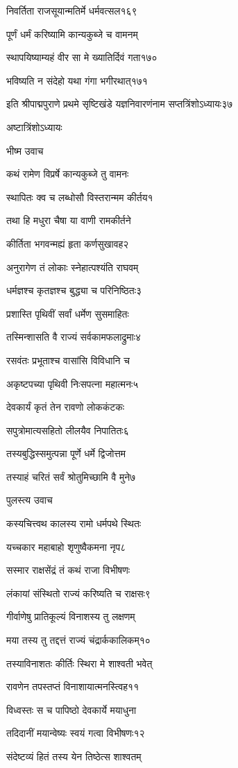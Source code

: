 निवर्तिता राजसूयान्मतिर्मे धर्मवत्सल१६९

पूर्णं धर्मं करिष्यामि कान्यकुब्जे च वामनम्

स्थापयिष्याम्यहं वीर सा मे ख्यातिर्दिवं गता१७०

भविष्यति न संदेहो यथा गंगा भगीरथात्१७१

इति श्रीपाद्मपुराणे प्रथमे सृष्टिखंडे यज्ञनिवारणंनाम सप्तत्रिंशोऽध्यायः३७

अष्टात्रिंशोऽध्यायः

भीष्म उवाच

कथं रामेण विप्रर्षे कान्यकुब्जे तु वामनः

स्थापितः क्व च लब्धोसौ विस्तरान्मम कीर्तय१

तथा हि मधुरा चैषा या वाणी रामकीर्तने

कीर्तिता भगवन्मह्यं हृता कर्णसुखावह२

अनुरागेण तं लोकाः स्नेहात्पश्यंति राघवम्

धर्मज्ञश्च कृतज्ञश्च बुद्ध्या च परिनिष्ठितः३

प्रशास्ति पृथिवीं सर्वां धर्मेण सुसमाहितः

तस्मिन्शासति वै राज्यं सर्वकामफलाद्रुमाः४

रसवंतः प्रभूताश्च वासांसि विविधानि च

अकृष्टपच्या पृथिवी निःसपत्ना महात्मनः५

देवकार्यं कृतं तेन रावणो लोककंटकः

सपुत्रोमात्यसहितो लीलयैव निपातितः६

तस्यबुद्धिस्समुत्पन्ना पूर्णे धर्मे द्विजोत्तम

तस्याहं चरितं सर्वं श्रोतुमिच्छामि वै मुने७

पुलस्त्य उवाच

कस्यचित्त्वथ कालस्य रामो धर्मपथे स्थितः

यच्चकार महाबाहो शृणुष्वैकमना नृप८

सस्मार राक्षसेंद्रं तं कथं राजा विभीषणः

लंकायां संस्थितो राज्यं करिष्यति च राक्षसः९

गीर्वाणेषु प्रातिकूल्यं विनाशस्य तु लक्षणम्

मया तस्य तु तद्दत्तं राज्यं चंद्रार्ककालिकम्१०

तस्याविनाशतः कीर्तिः स्थिरा मे शाश्वती भवेत्

रावणेन तपस्तप्तं विनाशायात्मनस्त्विह११

विध्वस्तः स च पापिष्ठो देवकार्ये मयाधुना

तदिदानीं मयान्वेष्यः स्वयं गत्वा विभीषणः१२

संदेष्टव्यं हितं तस्य येन तिष्ठेत्स शाश्वतम्

